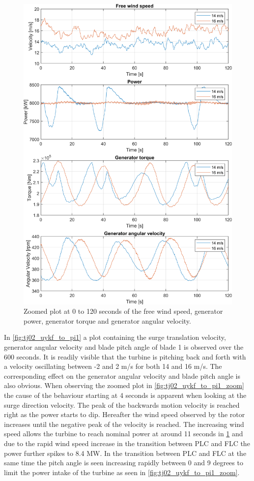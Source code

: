 \begin{figure}[ht]
	\centering
	\includegraphics[width=0.8\linewidth]{Graphics/TestResults/tj02/vhfree_power_genmom_omgen_zoom.png}
	\caption{Zoomed plot at 0 to 120 seconds of the free wind speed, generator power, generator torque and generator angular velocity.}
	\label{fig:tj02_vfree_to_genangvel_zoom}
\end{figure}
In \cref{fig:tj02_uykf_to_pi1} a plot containing the surge translation velocity, generator angular velocity and blade pitch angle of blade 1 is observed over the 600 seconds. It is readily visible that the turbine is pitching back and forth with a velocity oscillating between -2 and 2 m/s for both 14 and 16 m/s. The corresponding effect on the generator angular velocity and blade pitch angle is also obvious. When observing the zoomed plot in \cref{fig:tj02_uykf_to_pi1_zoom} the cause of the behaviour starting at 4 seconds is apparent when looking at the surge direction velocity. The peak of the backwards motion velocity is reached right as the power starts to dip. Hereafter the wind speed observed by the rotor increases until the negative peak of the velocity is reached. The increasing wind speed allows the turbine to reach nominal power at around 11 seconds in \cref{fig:tj02_vfree_to_genangvel_zoom} and due to the rapid wind speed increase in the transition between PLC and FLC the power further spikes to 8.4 MW. In the transition between PLC and FLC at the same time the pitch angle is seen increasing rapidly between 0 and 9 degrees to limit the power intake of the turbine as seen in \cref{fig:tj02_uykf_to_pi1_zoom}.

